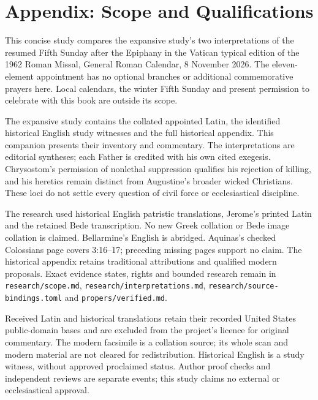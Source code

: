 \section{Appendix: Scope and Qualifications}
This concise study compares the expansive study's two interpretations of
the resumed Fifth Sunday after the Epiphany in the Vatican typical edition
of the 1962 Roman Missal, General Roman Calendar, 8 November 2026. The
eleven-element appointment has no optional branches or additional
commemorative prayers here. Local calendars, the winter Fifth Sunday and
present permission to celebrate with this book are outside its scope.

The expansive study contains the collated appointed Latin, the identified
historical English study witnesses and the full historical appendix. This
companion presents their inventory and commentary. The interpretations
are editorial syntheses; each Father is credited with his own cited
exegesis. Chrysostom's permission of nonlethal suppression qualifies his
rejection of killing, and his heretics remain distinct from Augustine's
broader wicked Christians. These loci do not settle every question of
civil force or ecclesiastical discipline.

The research used historical English patristic translations, Jerome's
printed Latin and the retained Bede transcription. No new Greek collation
or Bede image collation is claimed. Bellarmine's English is abridged.
Aquinas's checked Colossians page covers 3:16--17; preceding missing
pages support no claim. The historical appendix retains traditional
attributions and qualified modern proposals. Exact evidence states,
rights and bounded research remain in \texttt{research/scope.md},
\texttt{research/interpretations.md}, \texttt{research/source-bindings.toml}
and \texttt{propers/verified.md}.

Received Latin and historical translations retain their recorded United
States public-domain bases and are excluded from the project's licence
for original commentary. The modern facsimile is a collation source;
its whole scan and modern material are not cleared for redistribution.
Historical English is a study witness, without approved proclaimed
status. Author proof checks and independent reviews are separate events;
this study claims no external or ecclesiastical approval.

